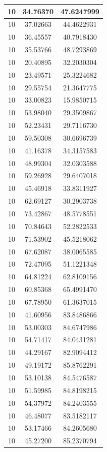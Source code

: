 \documentclass[
]{book}
\begin{document}
\begin{tabular}{c|c|c}
\hline
10 & 34.76370 & 47.6247999\\
\hline
10 & 37.02663 & 44.4622931\\
\hline
10 & 36.45557 & 40.7918430\\
\hline
10 & 35.53766 & 48.7293869\\
\hline
10 & 20.40895 & 32.2030304\\
\hline
10 & 23.49571 & 25.3224682\\
\hline
10 & 29.55754 & 21.3647775\\
\hline
10 & 33.00823 & 15.9850715\\
\hline
10 & 53.98040 & 29.3509867\\
\hline
10 & 52.23431 & 29.7116730\\
\hline
10 & 59.50308 & 30.6696739\\
\hline
10 & 41.16378 & 34.3157583\\
\hline
10 & 48.99304 & 32.0303588\\
\hline
10 & 59.26928 & 29.6407018\\
\hline
10 & 45.46918 & 33.8311927\\
\hline
10 & 62.69127 & 30.2903738\\
\hline
10 & 73.42867 & 48.5778551\\
\hline
10 & 70.84643 & 52.2822533\\
\hline
10 & 71.53902 & 45.5218062\\
\hline
10 & 67.62087 & 38.0065585\\
\hline
10 & 72.47095 & 51.1221348\\
\hline
10 & 64.81224 & 62.8109156\\
\hline
10 & 60.85368 & 65.4991470\\
\hline
10 & 67.78950 & 61.3637015\\
\hline
10 & 41.60956 & 83.8486866\\
\hline
10 & 53.00303 & 84.6747986\\
\hline
10 & 54.71417 & 84.0431281\\
\hline
10 & 44.29167 & 82.9094412\\
\hline
10 & 49.19172 & 85.8762291\\
\hline
10 & 53.10138 & 84.5476587\\
\hline
10 & 51.59985 & 84.8198215\\
\hline
10 & 54.37972 & 84.2403555\\
\hline
10 & 46.48077 & 83.5182117\\
\hline
10 & 53.17466 & 84.2605680\\
\hline
10 & 45.27200 & 85.2370794\\

\end{tabular}
\end{document}

